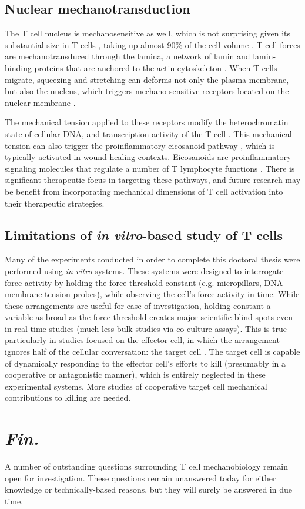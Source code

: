 \subsection{Nuclear mechanotransduction}

The T cell nucleus is mechanosensitive as well, which is not surprising given its substantial size in T cells \cite{McGregor2016}, taking up almost 90\% of the cell volume \cite{Strokotov2009}. T cell forces are mechanotransduced through the lamina, a network of lamin and lamin-binding proteins that are anchored to the actin cytoskeleton \cite{Rossy2018, Enyedi2017, Dahl2008}. When T cells migrate, squeezing and stretching can deforms not only the plasma membrane, but also the nucleus, which triggers mechano-sensitive receptors located on the nuclear membrane \cite{Dahl2008, Guilluy2014}. 

The mechanical tension applied to these receptors modify the heterochromatin state of cellular DNA, and transcription activity of the T cell \cite{Le2016}. This mechanical tension can also trigger the proinflammatory eicosanoid pathway \cite{Enyedi2017}, which is typically activated in wound healing contexts. Eicosanoids are proinflammatory signaling molecules that regulate a number of T lymphocyte functions \cite{Lone2013}. There is significant therapeutic focus in targeting these pathways, and future research may be benefit from incorporating mechanical dimensions of T cell activation into their therapeutic strategies. 

\subsection{Limitations of \textit{in vitro}-based study of T cells}

Many of the experiments conducted in order to complete this doctoral thesis were performed using \textit{in vitro} systems. These systems were designed to interrogate force activity by holding the force threshold constant (e.g. micropillars, DNA membrane tension probes), while observing the cell's force activity in time. While these arrangements are useful for ease of investigation, holding constant a variable as broad as the force threshold creates major scientific blind spots even in real-time studies (much less bulk studies via co-culture assays). This is true particularly in studies focused on the effector cell, in which the arrangement ignores half of the cellular conversation: the target cell \cite{Tello-lafoz2021}. The target cell is capable of dynamically responding to the effector cell's efforts to kill (presumably in a cooperative or antagonistic manner), which is entirely neglected in these experimental systems.  More studies of cooperative target cell mechanical contributions to killing are needed.

\section{\textit{Fin.}}

A number of outstanding questions surrounding T cell mechanobiology remain open for investigation. These questions remain unanswered today for either knowledge or technically-based reasons, but they will surely be answered in due time.

